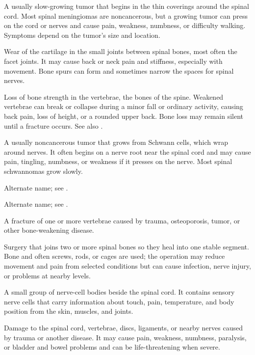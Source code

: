  A usually slow-growing tumor that begins in
  the thin coverings around the spinal cord. Most spinal meningiomas are
  noncancerous, but a growing tumor can press on the cord or nerves and
  cause pain, weakness, numbness, or difficulty walking. Symptoms depend
  on the tumor's size and location.

 Wear of the cartilage in the small
  joints between spinal bones, most often the facet joints. It may cause
  back or neck pain and stiffness, especially with movement. Bone spurs
  can form and sometimes narrow the spaces for spinal nerves.

 Loss of bone strength in the vertebrae,
  the bones of the spine. Weakened vertebrae can break or collapse
  during a minor fall or ordinary activity, causing back pain, loss of
  height, or a rounded upper back. Bone loss may remain silent until a
  fracture occurs. See also .

 A usually noncancerous tumor that grows from
  Schwann cells, which wrap around nerves. It often begins on a nerve
  root near the spinal cord and may cause pain, tingling, numbness, or
  weakness if it presses on the nerve. Most spinal schwannomas grow
  slowly.

 Alternate name; see
  .

 Alternate name; see .

 A fracture of one or more vertebrae caused by trauma, osteoporosis, tumor, or other bone-weakening disease.

 Surgery that joins two or more spinal bones so they heal into one stable segment. Bone and often screws, rods, or cages are used; the operation may reduce movement and pain from selected conditions but can cause infection, nerve injury, or problems at nearby levels.

 A small group of nerve-cell bodies beside the spinal cord. It contains sensory nerve cells that carry information about touch, pain, temperature, and body position from the skin, muscles, and joints.

 Damage to the spinal cord, vertebrae, discs, ligaments, or nearby nerves caused by trauma or another disease. It may cause pain, weakness, numbness, paralysis, or bladder and bowel problems and can be life-threatening when severe.

